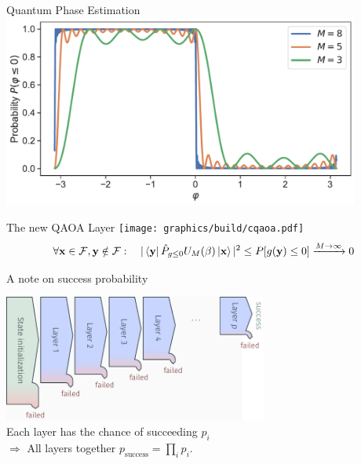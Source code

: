 \documentclass[aspectratio=169]{beamer}
\begin{document}
\begin{frame}{Quantum Phase Estimation}
    \centering
    \includegraphics[width=0.88\textwidth]{../plots/prob.pdf}
\end{frame}

\begin{frame}{The new QAOA Layer}
    \texttt{[image: graphics/build/cqaoa.pdf]}
    \vspace{6pt}
    \[
        \forall\mathbf{x} \in \mathcal{F}, \mathbf{y} \notin \mathcal{F}:\quad
        |\bra{\mathbf{y}}\hat P_{g \leq 0} U_M(\beta) \ket{\mathbf{x}}|^2 \leq
        P[g(\mathbf{y}) \leq 0] \xrightarrow{M\rightarrow
    \infty} 0
    \]
\end{frame}

\begin{frame}{A note on success probability}
    \begin{center}
        \includegraphics[width=0.65\textwidth]{graphics/build/probability.pdf}\\[6pt]
    Each layer has the chance of succeeding $p_i$\\$\Rightarrow$ All layers together
    $p_\text{success} = \prod_i p_i$.
    \end{center}

\end{frame}
\end{document}
